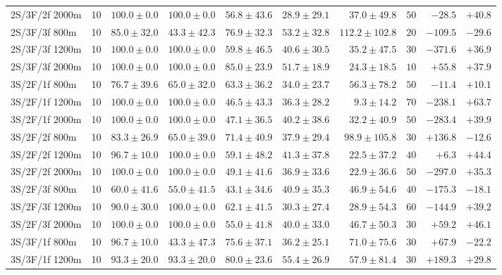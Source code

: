 \begin{tabular}{l r r r r r r r r r}
2S/3F/2f 2000m & 10 & $100.0 \pm 0.0$ & $100.0 \pm 0.0$ & $56.8 \pm 43.6$ & $28.9 \pm 29.1$ & $37.0 \pm 49.8$ & $50$ & $-28.5$ & $+40.8$ \\
2S/3F/3f 800m & 10 & $85.0 \pm 32.0$ & $43.3 \pm 42.3$ & $76.9 \pm 32.3$ & $53.2 \pm 32.8$ & $112.2 \pm 102.8$ & $20$ & $-109.5$ & $-29.6$ \\
2S/3F/3f 1200m & 10 & $100.0 \pm 0.0$ & $100.0 \pm 0.0$ & $59.8 \pm 46.5$ & $40.6 \pm 30.5$ & $35.2 \pm 47.5$ & $30$ & $-371.6$ & $+36.9$ \\
2S/3F/3f 2000m & 10 & $100.0 \pm 0.0$ & $100.0 \pm 0.0$ & $85.0 \pm 23.9$ & $51.7 \pm 18.9$ & $24.3 \pm 18.5$ & $10$ & $+55.8$ & $+37.9$ \\
3S/2F/1f 800m & 10 & $76.7 \pm 39.6$ & $65.0 \pm 32.0$ & $63.3 \pm 36.2$ & $34.0 \pm 23.7$ & $56.3 \pm 78.2$ & $50$ & $-11.4$ & $+10.1$ \\
3S/2F/1f 1200m & 10 & $100.0 \pm 0.0$ & $100.0 \pm 0.0$ & $46.5 \pm 43.3$ & $36.3 \pm 28.2$ & $9.3 \pm 14.2$ & $70$ & $-238.1$ & $+63.7$ \\
3S/2F/1f 2000m & 10 & $100.0 \pm 0.0$ & $100.0 \pm 0.0$ & $47.1 \pm 36.5$ & $40.2 \pm 38.6$ & $32.2 \pm 40.9$ & $50$ & $-283.4$ & $+39.9$ \\
3S/2F/2f 800m & 10 & $83.3 \pm 26.9$ & $65.0 \pm 39.0$ & $71.4 \pm 40.9$ & $37.9 \pm 29.4$ & $98.9 \pm 105.8$ & $30$ & $+136.8$ & $-12.6$ \\
3S/2F/2f 1200m & 10 & $96.7 \pm 10.0$ & $100.0 \pm 0.0$ & $59.1 \pm 48.2$ & $41.3 \pm 37.8$ & $22.5 \pm 37.2$ & $40$ & $+6.3$ & $+44.4$ \\
3S/2F/2f 2000m & 10 & $100.0 \pm 0.0$ & $100.0 \pm 0.0$ & $49.1 \pm 41.6$ & $36.9 \pm 33.6$ & $22.9 \pm 36.6$ & $50$ & $-297.0$ & $+35.3$ \\
3S/2F/3f 800m & 10 & $60.0 \pm 41.6$ & $55.0 \pm 41.5$ & $43.1 \pm 34.6$ & $40.9 \pm 35.3$ & $46.9 \pm 54.6$ & $40$ & $-175.3$ & $-18.1$ \\
3S/2F/3f 1200m & 10 & $90.0 \pm 30.0$ & $100.0 \pm 0.0$ & $62.1 \pm 41.5$ & $30.3 \pm 27.4$ & $28.9 \pm 54.3$ & $60$ & $-144.9$ & $+39.2$ \\
3S/2F/3f 2000m & 10 & $100.0 \pm 0.0$ & $100.0 \pm 0.0$ & $55.0 \pm 41.8$ & $40.0 \pm 33.0$ & $46.7 \pm 50.3$ & $30$ & $+59.2$ & $+46.1$ \\
3S/3F/1f 800m & 10 & $96.7 \pm 10.0$ & $43.3 \pm 47.3$ & $75.6 \pm 37.1$ & $36.2 \pm 25.1$ & $71.0 \pm 75.6$ & $30$ & $+67.9$ & $-22.2$ \\
3S/3F/1f 1200m & 10 & $93.3 \pm 20.0$ & $93.3 \pm 20.0$ & $80.0 \pm 23.6$ & $55.4 \pm 26.9$ & $57.9 \pm 81.4$ & $30$ & $+189.3$ & $+29.8$ \\

\end{tabular}
